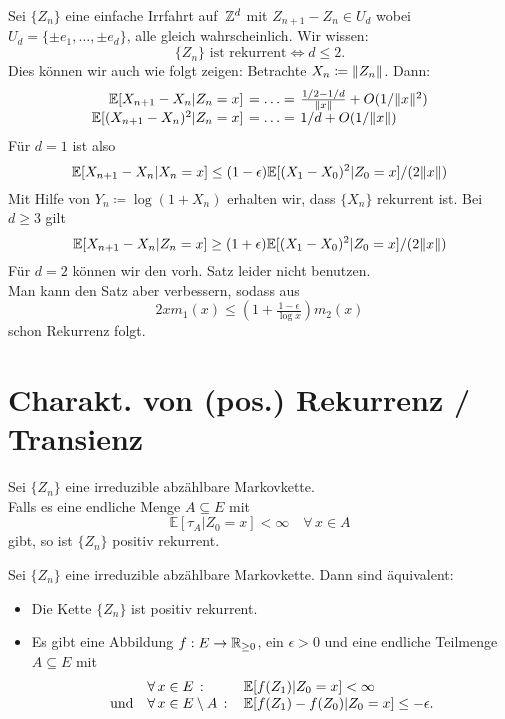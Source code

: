 \documentclass{cheat-sheet}
\newcommand{\E}{\mathbb{E}} %
\begin{document}
\begin{bsp}
  Sei $\{ Z_n \}$ eine einfache Irrfahrt auf~$\mathbb{Z}^d$ mit
  $Z_{n+1} - Z_n \in U_d$ wobei $U_d = \{ \pm e_1, \ldots, \pm e_d \}$, alle gleich wahrscheinlich.
  Wir wissen:
  \[
    \{ Z_n \} \text{ ist rekurrent} \iff d \leq 2.
  \]
  Dies können wir auch wie folgt zeigen:
  Betrachte $X_n \coloneqq \lVert Z_n\rVert$.
  Dann:
  \[
    \arraycolsep=2pt
    \begin{array}{r l l}
      \E[ X_{n+1} - X_n | Z_n = x ] & = \ldots = & \tfrac{1/2 - 1/d}{\norm{x}} + O(1 / \norm{x}^2) \\
      \E[ (X_{n+1} - X_n)^2 | Z_n = x ] & = \ldots = & 1/d + O(1 / \norm{x})
    \end{array}
  \]
  Für $d = 1$ ist also
  \[ \E[ X_{n+1} - X_n | X_n = x ] \leq (1-\epsilon) \E[ (X_1 - X_0)^2 | Z_0 = x ] / (2 \norm{x}) \]
  Mit Hilfe von $Y_n \coloneqq \log(1 + X_n)$ erhalten wir, dass $\{ X_n \}$ rekurrent ist.
  Bei $d \geq 3$ gilt
  \[ \E[ X_{n+1} - X_n | Z_n = x ] \geq (1+\epsilon) \E[ (X_1 - X_0)^2 | Z_0 = x ] / (2 \norm{x}) \]
  Für $d = 2$ können wir den vorh. Satz leider nicht benutzen. \\
  Man kann den Satz aber verbessern, sodass aus
  \[ 2 x m_1(x) \leq (1 + \tfrac{1-\epsilon}{\log x}) m_2(x) \]
  schon Rekurrenz folgt.
\end{bsp}

\columnbreak

\section{Charakt. von (pos.) Rekurrenz / Transienz}


\begin{lem}
  Sei $\{ Z_n \}$ eine irreduzible abzählbare Markovkette. \\
  Falls es eine endliche Menge $A \subseteq E$ mit
  \[
    \E[ \tau_A | Z_0 = x ] < \infty
    \quad \forall\, x \in A
  \]
  gibt, so ist $\{ Z_n \}$ positiv rekurrent.
\end{lem}

\begin{satz}
  Sei $\{ Z_n \}$ eine irreduzible abzählbare Markovkette.
  Dann sind äquivalent:
  \begin{itemize}
    \item Die Kette $\{ Z_n \}$ ist positiv rekurrent.
    \item Es gibt eine Abbildung $f : E \to \mathbb{R}_{\geq 0}$, ein $\epsilon > 0$ und eine endliche Teilmenge $A \subseteq E$ mit
    \[
      \begin{array}{r l l}
        & \fa{x \in E} & \E[ f(Z_1) | Z_0 = x ] < \infty \\
        \text{und} & \fa{x \in E \setminus A} & \E[ f(Z_1) - f(Z_0) | Z_0 = x ] \leq - \epsilon.
      \end{array}
    \]
  \end{itemize}
\end{satz}
\end{document}
